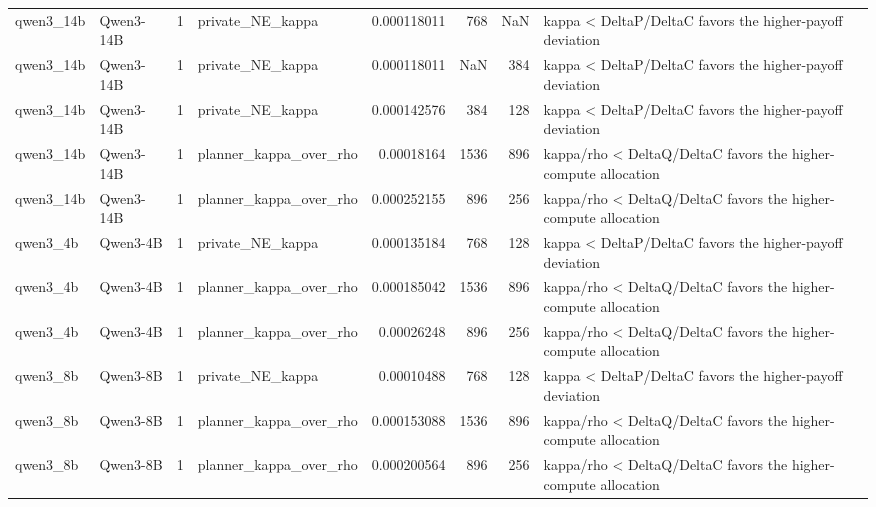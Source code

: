 \begin{tabular}{llrlrrrl}
qwen3_14b & Qwen3-14B & 1 & private_NE_kappa & 0.000118011 & 768 & NaN & kappa < DeltaP/DeltaC favors the higher-payoff deviation \\
qwen3_14b & Qwen3-14B & 1 & private_NE_kappa & 0.000118011 & NaN & 384 & kappa < DeltaP/DeltaC favors the higher-payoff deviation \\
qwen3_14b & Qwen3-14B & 1 & private_NE_kappa & 0.000142576 & 384 & 128 & kappa < DeltaP/DeltaC favors the higher-payoff deviation \\
qwen3_14b & Qwen3-14B & 1 & planner_kappa_over_rho & 0.00018164 & 1536 & 896 & kappa/rho < DeltaQ/DeltaC favors the higher-compute allocation \\
qwen3_14b & Qwen3-14B & 1 & planner_kappa_over_rho & 0.000252155 & 896 & 256 & kappa/rho < DeltaQ/DeltaC favors the higher-compute allocation \\
qwen3_4b & Qwen3-4B & 1 & private_NE_kappa & 0.000135184 & 768 & 128 & kappa < DeltaP/DeltaC favors the higher-payoff deviation \\
qwen3_4b & Qwen3-4B & 1 & planner_kappa_over_rho & 0.000185042 & 1536 & 896 & kappa/rho < DeltaQ/DeltaC favors the higher-compute allocation \\
qwen3_4b & Qwen3-4B & 1 & planner_kappa_over_rho & 0.00026248 & 896 & 256 & kappa/rho < DeltaQ/DeltaC favors the higher-compute allocation \\
qwen3_8b & Qwen3-8B & 1 & private_NE_kappa & 0.00010488 & 768 & 128 & kappa < DeltaP/DeltaC favors the higher-payoff deviation \\
qwen3_8b & Qwen3-8B & 1 & planner_kappa_over_rho & 0.000153088 & 1536 & 896 & kappa/rho < DeltaQ/DeltaC favors the higher-compute allocation \\
qwen3_8b & Qwen3-8B & 1 & planner_kappa_over_rho & 0.000200564 & 896 & 256 & kappa/rho < DeltaQ/DeltaC favors the higher-compute allocation \\
\bottomrule
\end{tabular}
